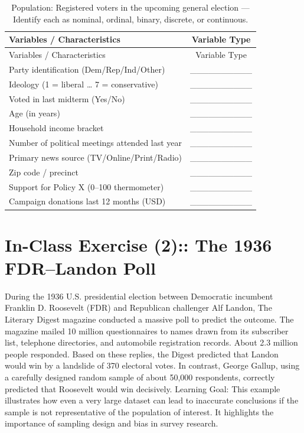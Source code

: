 \documentclass[
  letterpaper,
  DIV=11,
  numbers=noendperiod]{scrreprt}
\begin{document}
\begin{longtable}[]{@{}lc@{}}
\caption{Population: Registered voters in the upcoming general election
--- Identify each as nominal, ordinal, binary, discrete, or
continuous.}\tabularnewline
\toprule\noalign{}
Variables / Characteristics & Variable Type \\
\midrule\noalign{}
\endfirsthead
\toprule\noalign{}
Variables / Characteristics & Variable Type \\
\midrule\noalign{}
\endhead
\bottomrule\noalign{}
\endlastfoot
Party identification (Dem/Rep/Ind/Other) & \_\_\_\_\_\_\_\_\_\_ \\
Ideology (1 = liberal \ldots{} 7 = conservative) &
\_\_\_\_\_\_\_\_\_\_ \\
Voted in last midterm (Yes/No) & \_\_\_\_\_\_\_\_\_\_ \\
Age (in years) & \_\_\_\_\_\_\_\_\_\_ \\
Household income bracket & \_\_\_\_\_\_\_\_\_\_ \\
Number of political meetings attended last year &
\_\_\_\_\_\_\_\_\_\_ \\
Primary news source (TV/Online/Print/Radio) & \_\_\_\_\_\_\_\_\_\_ \\
Zip code / precinct & \_\_\_\_\_\_\_\_\_\_ \\
Support for Policy X (0--100 thermometer) & \_\_\_\_\_\_\_\_\_\_ \\
Campaign donations last 12 months (USD) & \_\_\_\_\_\_\_\_\_\_ \\
\end{longtable}

\section{In-Class Exercise (2):: The 1936 FDR--Landon
Poll}\label{in-class-exercise-2-the-1936-fdrlandon-poll}

During the 1936 U.S. presidential election between Democratic incumbent
Franklin D. Roosevelt (FDR) and Republican challenger Alf Landon, The
Literary Digest magazine conducted a massive poll to predict the
outcome. The magazine mailed 10 million questionnaires to names drawn
from its subscriber list, telephone directories, and automobile
registration records. About 2.3 million people responded. Based on these
replies, the Digest predicted that Landon would win by a landslide of
370 electoral votes. In contrast, George Gallup, using a carefully
designed random sample of about 50,000 respondents, correctly predicted
that Roosevelt would win decisively. Learning Goal: This example
illustrates how even a very large dataset can lead to inaccurate
conclusions if the sample is not representative of the population of
interest. It highlights the importance of sampling design and bias in
survey research.
\end{document}
